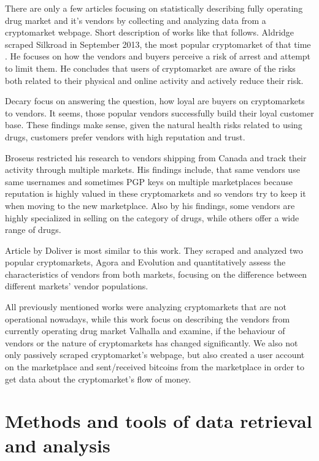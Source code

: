 \documentclass[
  digital, %
  table,   %
  lof,     %
  lot,     %
  oneside
]{fithesis3}
\begin{document}
There are only a few articles focusing on statistically describing fully operating drug market and it's vendors
by collecting and analyzing data from a cryptomarket webpage. Short description of works like that follows.
Aldridge \parencite{aldridge2017delivery} scraped Silkroad in September 2013, the most popular cryptomarket of that time
.
He focuses on how the vendors and buyers perceive a risk of arrest and attempt to limit them.
He concludes that users of cryptomarket are aware of the risks both related to their physical and online activity
and actively reduce their risk.

Decary \parencite{decary2017repeat} focus on answering the question, how loyal are buyers on cryptomarkets to vendors. It seems, those popular vendors successfully build their loyal
customer base. These findings make sense, given the natural health risks related to using drugs,
customers prefer vendors with high reputation and trust.

Broseus \parencite{broseus2016studying} restricted his research to vendors shipping from Canada
and track their activity through multiple markets. His findings include, that same vendors
use same usernames and sometimes PGP keys on multiple marketplaces because reputation
is highly valued in these cryptomarkets and so vendors try to keep it when moving to the new marketplace.
Also by his findings, some vendors are highly specialized in selling on the category of drugs, while others offer a wide range of drugs.

Article by Doliver \parencite{dolliver2016characteristics} is most similar to this work.
They scraped and analyzed two popular cryptomarkets, Agora and Evolution and quantitatively assess
the characteristics of vendors from both markets, focusing on the difference
 between different markets' vendor populations.

 All previously mentioned works were analyzing cryptomarkets that are not operational nowadays,
 while this work focus on describing the vendors from currently operating drug market Valhalla 
 and examine, if the behaviour of vendors or the nature of cryptomarkets
 has changed significantly. We also not only passively scraped cryptomarket's webpage,
 but also created a user account on the marketplace and sent/received bitcoins from the marketplace
 in order to get data about the cryptomarket's flow of money.
 
\chapter{Methods and tools of data retrieval and analysis}
\end{document}
